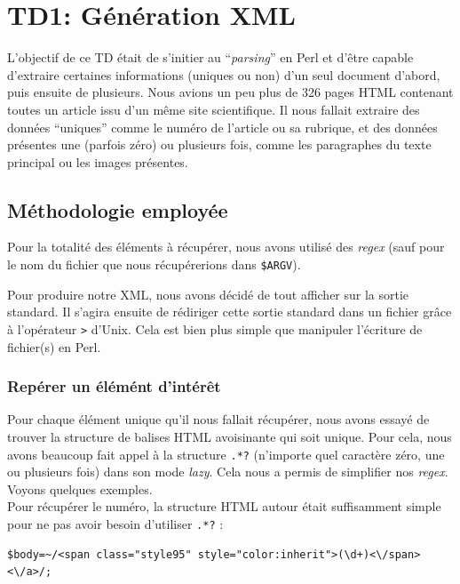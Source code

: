 \chapter{TD1: Génération XML}

L'objectif de ce TD était de s'initier au ``\textit{parsing}'' en Perl et d'être capable d'extraire certaines informations (uniques ou non) d'un seul document d'abord, puis ensuite de plusieurs. Nous avions un peu plus de 326 pages HTML contenant toutes un article issu d'un même site scientifique. Il nous fallait extraire des données ``uniques'' comme le numéro de l'article ou sa rubrique, et des données présentes une (parfois zéro) ou plusieurs fois, comme les paragraphes du texte principal ou les images présentes.

\section{Méthodologie employée}

Pour la totalité des éléments à récupérer, nous avons utilisé des \textit{regex} (sauf pour le nom du fichier que nous récupérerions dans \lstinline{$ARGV}).

Pour produire notre XML, nous avons décidé de tout afficher sur la sortie standard. Il s'agira ensuite de rédiriger cette sortie standard dans un fichier grâce à l'opérateur \lstinline{>} d'Unix. Cela est bien plus simple que manipuler l'écriture de fichier(s) en Perl.

\subsection{Repérer un élémént d'intérêt}

Pour chaque élément unique qu'il nous fallait récupérer, nous avons essayé de trouver la structure de balises HTML avoisinante qui soit unique. Pour cela, nous avons beaucoup fait appel à la structure \lstinline{.*?} (n'importe quel caractère zéro, une ou plusieurs fois) dans son mode \textit{lazy}. Cela nous a permis de simplifier nos \textit{regex}. Voyons quelques exemples.\\
Pour récupérer le numéro, la structure HTML autour était suffisamment simple pour ne pas avoir besoin d'utiliser \lstinline{.*?} :

\perl
\begin{lstlisting}
$body=~/<span class="style95" style="color:inherit">(\d+)<\/span><\/a>/;
\end{lstlisting}

